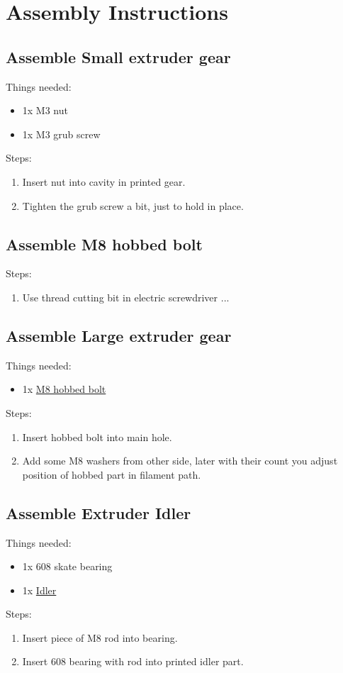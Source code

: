 \documentclass[11pt]{article}
\begin{document}
\newpage

\section{Assembly Instructions}

\subsection{Assemble Small extruder gear}
Things needed:
\begin{itemize}
\item 1x M3 nut
\item 1x M3 grub screw
\end{itemize}
Steps:
\begin{enumerate}
\item Insert nut into cavity in printed gear.
\item Tighten the grub screw a bit, just to hold in place.
\end{enumerate}

\subsection{Assemble M8 hobbed bolt}Steps:
\begin{enumerate}
\item Use thread cutting bit in electric screwdriver ...
\end{enumerate}

\subsection{Assemble Large extruder gear}
Things needed:
\begin{itemize}
\item 1x \hyperlink{thing_hobbed-bolt}{M8 hobbed bolt}
\end{itemize}
Steps:
\begin{enumerate}
\item Insert hobbed bolt into main hole.
\item Add some M8 washers from other side, later with their count you adjust position of hobbed part in filament path.
\end{enumerate}

\subsection{Assemble Extruder Idler}
Things needed:
\begin{itemize}
\item 1x 608 skate bearing
\item 1x \hyperlink{thing_idler-m8-piece}{Idler}
\end{itemize}
Steps:
\begin{enumerate}
\item Insert piece of M8 rod into bearing.
\item Insert 608 bearing with rod into printed idler part.
\end{enumerate}
\end{document}
